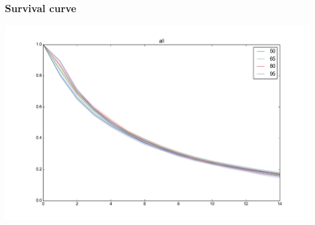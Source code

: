 \documentclass[bigger]{beamer}
\begin{document}
\begin{frame}
  \frametitle{Survival curve}
  \includegraphics[width=\textwidth]{img/survival-curve}
\end{frame}
\end{document}
